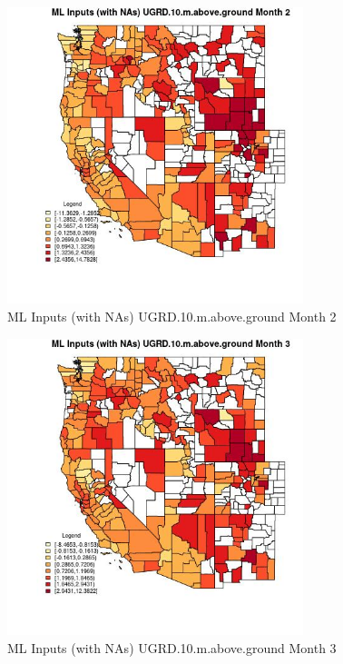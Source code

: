 \begin{figure} 
\centering  
\includegraphics[width=0.77\textwidth]{Code_Outputs/Report_ML_input_PM25_Step4_part_f_de_duplicated_aveswNAs_CountyUGRD10mabovegroundmedianMonth2.jpg} 
\caption{\label{fig:Report_ML_input_PM25_Step4_part_f_de_duplicated_aveswNAsCountyUGRD10mabovegroundmedianMonth2}ML Inputs (with NAs) UGRD.10.m.above.ground Month 2} 
\end{figure} 
 

\clearpage 

\begin{figure} 
\centering  
\includegraphics[width=0.77\textwidth]{Code_Outputs/Report_ML_input_PM25_Step4_part_f_de_duplicated_aveswNAs_CountyUGRD10mabovegroundmedianMonth3.jpg} 
\caption{\label{fig:Report_ML_input_PM25_Step4_part_f_de_duplicated_aveswNAsCountyUGRD10mabovegroundmedianMonth3}ML Inputs (with NAs) UGRD.10.m.above.ground Month 3} 
\end{figure} 
 

